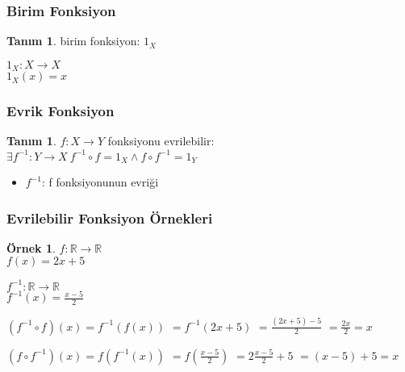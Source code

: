 \documentclass[dvipsnames]{beamer}
\theoremstyle{definition}
\newtheorem{tanim}[theorem]{Tanım}
\theoremstyle{example}
\newtheorem{ornek}[theorem]{Örnek}
\theoremstyle{plain}
\begin{document}
\begin{frame}
  \frametitle{Birim Fonksiyon}

  \begin{tanim}
    \alert{birim fonksiyon}: $1_X$

    \medskip
    $1_X: X \rightarrow X$\\
    $1_X(x) = x$
  \end{tanim}
\end{frame}

\begin{frame}
  \frametitle{Evrik Fonksiyon}

  \begin{tanim}
    $f: X \rightarrow Y$ fonksiyonu \alert{evrilebilir}:\\
      $\exists f^{-1}: Y \rightarrow X~f^{-1} \circ f = 1_X \wedge f \circ f^{-1} = 1_Y$

    \begin{itemize}
      \item $f^{-1}$: f fonksiyonunun \alert{evriği}
    \end{itemize}
  \end{tanim}
\end{frame}

\begin{frame}
  \frametitle{Evrilebilir Fonksiyon Örnekleri}

  \begin{ornek}
    $f: \mathbb{R} \rightarrow \mathbb{R}$\\
    $f(x) = 2x + 5$

    \pause
    \bigskip
    $f^{-1}: \mathbb{R} \rightarrow \mathbb{R}$\\
    $f^{-1}(x) = \frac{x - 5}{2}$

    \pause
    \bigskip
    $(f^{-1} \circ f)(x) = f^{-1}(f(x))$
    \pause
    $ = f^{-1}(2x + 5)$
    \pause
    $ = \frac{(2x + 5) - 5}{2}$
    \pause
    $ = \frac{2x}{2} = x$
    \medskip

    \pause
    $(f \circ f^{-1})(x) = f(f^{-1}(x))$
    \pause
    $ = f(\frac{x - 5}{2})$
    \pause
    $ = 2 \frac{x - 5}{2} + 5$
    \pause
    $ = (x - 5) + 5 = x$
  \end{ornek}
\end{frame}
\end{document}
